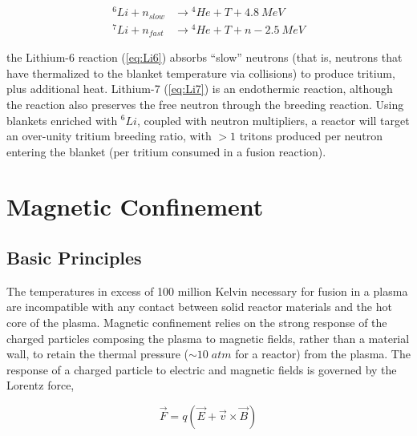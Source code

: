 \begin{align}
 {}^6\si{Li} + \si{n}_{slow} &\rightarrow {}^4\si{He} + \si{T} + \SI{4.8}{MeV}\label{eq:Li6}\\
 {}^7\si{Li} + \si{n}_{fast} &\rightarrow {}^4\si{He} + \si{T} + \si{n} - \SI{2.5}{MeV}\label{eq:Li7}
\end{align}

\noindent the Lithium-6 reaction (\cref{eq:Li6}) absorbs ``slow'' neutrons (that is, neutrons that have thermalized to the blanket temperature via collisions) to produce tritium, plus additional heat.  Lithium-7 (\cref{eq:Li7}) is an endothermic reaction, although the reaction also preserves the free neutron through the breeding reaction.  Using blankets enriched with ${}^6\si{Li}$, coupled with neutron multipliers, a reactor will target an over-unity tritium breeding ratio, with $>1$ tritons produced per neutron entering the blanket (\ie per tritium consumed in a fusion reaction).\nicesectionending


\section{Magnetic Confinement}\label{sec:intro_magnetic}

\subsection{Basic Principles}\label{subsec:intro_basic}

The temperatures in excess of 100 million Kelvin necessary for fusion in a plasma are incompatible with any contact between solid reactor materials and the hot core of the plasma.  Magnetic confinement relies on the strong response of the charged particles composing the plasma to magnetic fields, rather than a material wall, to retain the thermal pressure ($\sim 10 \;\si{atm}$ for a reactor) from the plasma.  The response of a charged particle to electric and magnetic fields is governed by the Lorentz force,

\begin{equation}\label{eq:lorentz}
 \vec{F} = q\left(\vec{E} + \vec{v} \times \vec{B}\right)
\end{equation}

